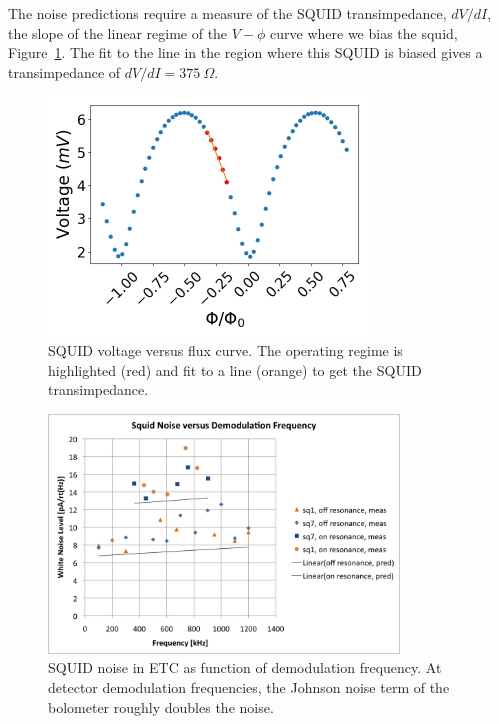 The noise predictions require a measure of the \ac{SQUID} transimpedance, $dV/dI$, the slope of the linear regime of the $V-\phi$ curve where we bias the squid, Figure~\ref{fig:squid_transimpedance}. 
The fit to the line in the region where this \ac{SQUID} is biased gives a transimpedance of $dV/dI=375~\Omega$. 

\begin{figure}[ht!]
\begin{center}
\includegraphics[height=2.5in]{figures/vphi_physical.png}
\caption{\ac{SQUID} voltage versus flux curve. The operating regime is highlighted (red) and fit to a line (orange) to get the \ac{SQUID} transimpedance.
\label{fig:squid_transimpedance} }
\end{center}
\end{figure}


\begin{figure}[ht!]
\begin{center}
\includegraphics[height=2.5in]{figures/squidnoise_temp}
\caption{\ac{SQUID} noise in \ac{ETC} as function of demodulation frequency. At detector demodulation frequencies, the Johnson noise term of the bolometer roughly doubles the noise.
\label{fig:dark_squid_noise} }
\end{center}
\end{figure}



